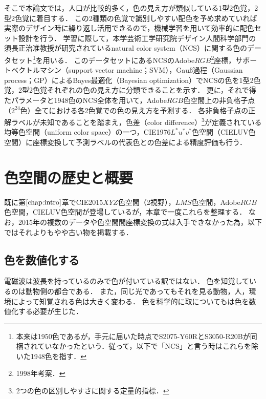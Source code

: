 \documentclass[uplatex,paper=a4,fontsize=4.0truemm,jafontsize=4.0truemm,head_space=30.0truemm,foot_space=30.0truemm,baselineskip=8.0truemm,line_length=40zw,gutter=25.0truemm,oneside,openany,fleqn,hanging_panctuation,open_bracket_pos=nibu_tentsuki,dvipdfmx,jis2004,book,titlepage]{jlreq}
\theoremstyle{mystyle}
\newcommand{\mathdisplaystyle}[1]{\(\displaystyle{#1}\)}
\newcommand{\Reference}[1]{\mathdisplaystyle{\ref{#1}}}
\begin{document}
			そこで本論文では，人口が比較的多く，色の見え方が類似している1型2色覚，2型2色覚に着目する．
			この2種類の色覚で識別しやすい配色を予め求めていれば実際のデザイン時に繰り返し活用できるので，機械学習を用いて効率的に配色セット設計を行う．
			学習に際して，本学芸術工学研究院デザイン人間科学部門の須長正治准教授が研究されているnatural color system（NCS）に関する色のデータセット\footnote{本来は1950色であるが，手元に届いた時点でS2075-Y60RとS3050-R20Bが同梱されていなかったという．従って，以下で「NCS」と言う時はこれらを除いた1948色を指す．}を用いる．
			このデータセットにあるNCSのAdobe\mathdisplaystyle{RGB}\footnote{1998年考案．}座標，サポートベクトルマシン（support vector machine；SVM），Gauß過程（Gaussian process；GP）によるBayes最適化（Bayesian optimization）でNCSの色を1型2色覚，2型2色覚それぞれの色の見え方に分類できることを示す．
			更に，それで得たパラメータと1948色のNCS全体を用いて，Adobe\mathdisplaystyle{RGB}色空間上の非負格子点（\mathdisplaystyle{2^{24}}色）全てにおける各2色覚での色の見え方を予測する．
			各非負格子点の正解ラベルが未知であることを踏まえ，色差（color difference）\footnote{2つの色の区別しやすさに関する定量的指標．}が定義されている均等色空間（uniform color space）の一つ，CIE1976\mathdisplaystyle{L^\ast u^\ast v^\ast}色空間（CIELUV色空間）\cite[p.~64]{Yaguchi2017b}に座標変換して予測ラベルの代表色との色差による精度評価も行う．
	\chapter{色空間の歴史と概要}
		既に第\Reference{chap:intro}章でCIE2015\mathdisplaystyle{XYZ}色空間（2\textdegree 視野），\mathdisplaystyle{LMS}色空間，Adobe\mathdisplaystyle{RGB}色空間，CIELUV色空間が登場しているが，本章で一度これらを整理する．
		なお，2015年の複数のデータや色空間間座標変換の式は入手できなかった為，以下ではそれよりもやや古い物を掲載する．
		\section{色を数値化する}
			電磁波は波長を持っているのみで色が付いている訳ではない．
			色を知覚しているのは動物側の都合である．
			また，同じ光であってもそれを見る動物，人，環境によって知覚される色は大きく変わる．
			色を科学的に取についてもは色を数値化する必要が生じた．
\end{document}

